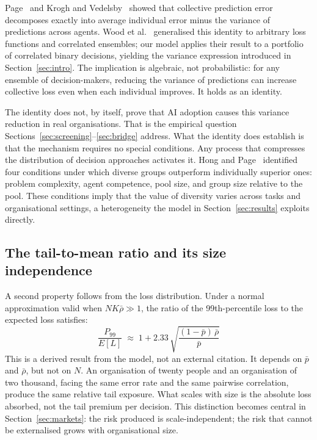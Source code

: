 \documentclass[11pt,a4paper]{article}
\begin{document}
Page~\cite{page_princeton_2007} and Krogh and
Vedelsby~\cite{krogh_nips_1995} showed that collective prediction error
decomposes exactly into average individual error minus the variance of
predictions across agents. Wood et al.~\cite{wood_jmlr_2023} generalised
this identity to arbitrary loss functions and correlated ensembles; our model
applies their result to a portfolio of correlated binary decisions, yielding
the variance expression introduced in Section~\ref{sec:intro}. The
implication is algebraic, not probabilistic: for any ensemble of
decision-makers, reducing the variance of predictions can increase collective
loss even when each individual improves. It holds as an identity.

The identity does not, by itself, prove that AI adoption causes this variance
reduction in real organisations. That is the empirical question
Sections~\ref{sec:screening}--\ref{sec:bridge} address. What the identity
does establish is that the mechanism requires no special conditions. Any
process that compresses the distribution of decision approaches activates it.
Hong and Page~\cite{hong_pnas_2004} identified four conditions under which
diverse groups outperform individually superior ones: problem complexity,
agent competence, pool size, and group size relative to the pool. These
conditions imply that the value of diversity varies across tasks and
organisational settings, a heterogeneity the model in
Section~\ref{sec:results} exploits directly.

\subsection{The tail-to-mean ratio and its size independence}

A second property follows from the loss distribution. Under a normal
approximation valid when $NK\bar{\rho}\gg 1$, the ratio of the
99th-percentile loss to the expected loss satisfies:
\[
  \frac{P_{99}}{E[L]} \;\approx\;
  1 + 2.33\,\sqrt{\frac{(1-\bar{p})\,\bar{\rho}}{\bar{p}}}
\]
This is a derived result from the model, not an external citation. It depends
on $\bar{p}$ and $\bar{\rho}$, but not on $N$. An organisation of twenty
people and an organisation of two thousand, facing the same error rate and
the same pairwise correlation, produce the same relative tail exposure. What
scales with size is the absolute loss absorbed, not the tail premium per
decision. This distinction becomes central in Section~\ref{sec:markets}: the
risk produced is scale-independent; the risk that cannot be externalised
grows with organisational size.
\end{document}

